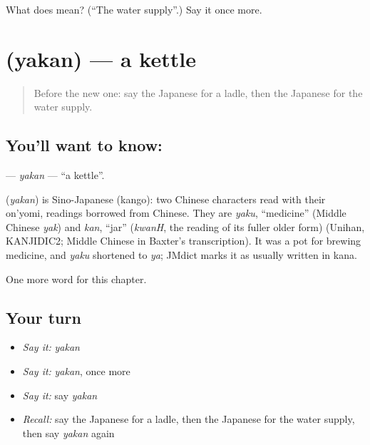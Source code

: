 \begin{tcolorbox}[breakable,colback=teal!4,colframe=teal!35!black,title={Before you move on}]
What does  mean? (\textquotedblleft{}The water supply\textquotedblright{}.) Say it once more.
\end{tcolorbox}
\section[\texorpdfstring{\ja{やかん} (yakan)}{やかん (yakan)}]{ (yakan) — a kettle}

\label{lesson:JA-C103-yakan}



\begin{quote}
Before the new one: say the Japanese for a ladle, then the Japanese for the water supply.
\end{quote}

\subsection*{You'll want to know: }
\textbf{} — \emph{yakan} — \textquotedblleft{}a kettle\textquotedblright{}.

\begin{cousinweb}
\textbf{} (\emph{yakan}) is Sino-Japanese (kango): two Chinese characters read with their on'yomi, readings borrowed from Chinese. They are \emph{yaku}, \textquotedblleft{}medicine\textquotedblright{} (Middle Chinese \emph{yak}) and \emph{kan}, \textquotedblleft{}jar\textquotedblright{} (\emph{kwanH}, the reading of its fuller older form) (Unihan, KANJIDIC2; Middle Chinese in Baxter's transcription). It was a pot for brewing medicine, and \emph{yaku} shortened to \emph{ya}; JMdict marks it as usually written in kana.
\end{cousinweb}

\begin{grammarlens}[title={What you've built}]
One more word for this chapter.
\end{grammarlens}

\subsection*{Your turn}
\begin{itemize}
\raggedright
  \item \emph{Say it:} \emph{yakan}
  \item \emph{Say it:} \emph{yakan}, once more
  \item \emph{Say it:} say \emph{yakan}
  \item \emph{Recall:} say the Japanese for a ladle, then the Japanese for the water supply, then say \emph{yakan} again
\end{itemize}

